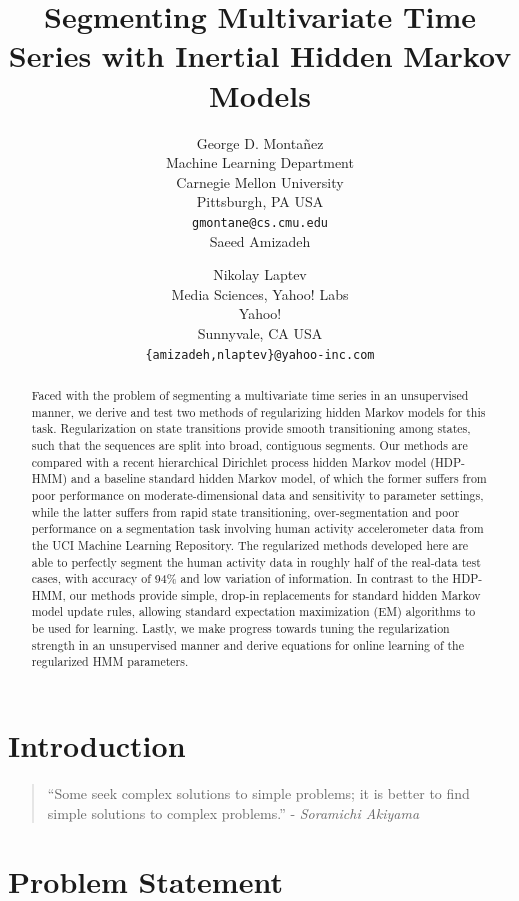 \documentclass[letterpaper]{article}
\title{Segmenting Multivariate Time Series with Inertial Hidden Markov Models}
\author{George D. Monta\~nez \\
Machine Learning Department\\
Carnegie Mellon University\\
Pittsburgh, PA USA\\
\texttt{gmontane@cs.cmu.edu} \\
\And
Saeed Amizadeh \and Nikolay Laptev\\
Media Sciences, Yahoo! Labs\\
Yahoo!\\
Sunnyvale, CA USA\\
\texttt{\{amizadeh,nlaptev\}@yahoo-inc.com}}
\newenvironment{dedication}
        {\vspace{0.0ex}\begin{quotation}\begin{center}\begin{em}}
        {\par\end{em}\end{center}\end{quotation}}
\begin{document}
\maketitle

\begin{abstract}
    Faced with the problem of segmenting a multivariate time series in an unsupervised manner, we derive and test two methods of regularizing hidden Markov models for this task. Regularization on state transitions provide smooth transitioning among states, such that the sequences are split into broad, contiguous segments. Our methods are compared with a recent hierarchical Dirichlet process hidden Markov model (HDP-HMM) and a baseline standard hidden Markov model, of which the former suffers from poor performance on moderate-dimensional data and sensitivity to parameter settings, while the latter suffers from rapid state transitioning, over-segmentation and poor performance on a segmentation task involving human activity accelerometer data from the UCI Machine Learning Repository. The regularized methods developed here are able to perfectly segment the human activity data in roughly half of the real-data test cases, with accuracy of 94\% and low variation of information. In contrast to the HDP-HMM, our methods provide simple, drop-in replacements for standard hidden Markov model update rules, allowing standard expectation maximization (EM) algorithms to be used for learning. Lastly, we make progress towards tuning the regularization strength in an unsupervised manner and derive equations for online learning of the regularized HMM parameters.
\end{abstract}

\section{Introduction}
\begin{dedication} ``Some seek complex solutions to simple problems; it is better to find simple solutions to complex problems.'' - \emph{Soramichi Akiyama}
\end{dedication}



\section{Problem Statement}
\end{document}
